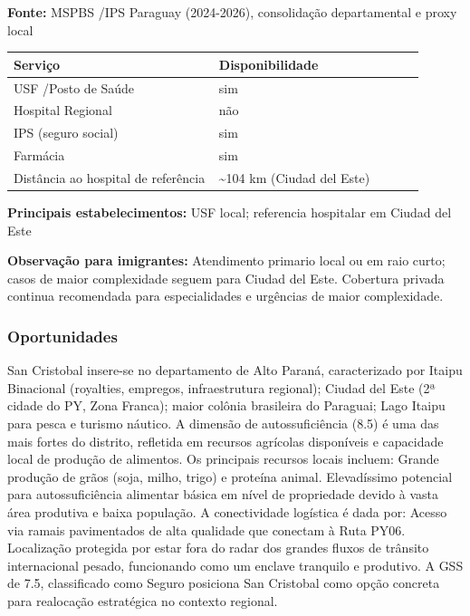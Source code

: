 \textbf{Fonte:} MSPBS /\allowbreak  IPS Paraguay (2024-2026), consolidação
departamental e proxy local

{\def\LTcaptype{none} %
\begin{longtable}{@{}>{\raggedright\arraybackslash}p{0.45\linewidth} >{\raggedright\arraybackslash}p{0.45\linewidth}@{}}
\toprule\noalign{}
Serviço & Disponibilidade \\
\midrule\noalign{}
\endhead
\bottomrule\noalign{}
\endlastfoot
USF /\allowbreak  Posto de Saúde & sim \\
Hospital Regional & não \\
IPS (seguro social) & sim \\
Farmácia & sim \\
Distância ao hospital de referência & \textasciitilde104 km (Ciudad del
Este) \\
\end{longtable}
}

\textbf{Principais estabelecimentos:} USF local; referencia hospitalar
em Ciudad del Este

\textbf{Observação para imigrantes:} Atendimento primario local ou em
raio curto; casos de maior complexidade seguem para Ciudad del Este.
Cobertura privada continua recomendada para especialidades e urgências
de maior complexidade.
\newpage

\subsubsection*{Oportunidades}\label{oport-san-cristobal-1012}
San Cristobal insere-se no departamento de Alto Paraná, caracterizado por Itaipu Binacional (royalties, empregos, infraestrutura regional); Ciudad del Este (2ª cidade do PY, Zona Franca); maior colônia brasileira do Paraguai; Lago Itaipu para pesca e turismo náutico. A dimensão de autossuficiência (8.5) é uma das mais fortes do distrito, refletida em recursos agrícolas disponíveis e capacidade local de produção de alimentos. Os principais recursos locais incluem: Grande produção de grãos (soja, milho, trigo) e proteína animal. Elevadíssimo potencial para autossuficiência alimentar básica em nível de propriedade devido à vasta área produtiva e baixa população. A conectividade logística é dada por: Acesso via ramais pavimentados de alta qualidade que conectam à Ruta PY06. Localização protegida por estar fora do radar dos grandes fluxos de trânsito internacional pesado, funcionando como um enclave tranquilo e produtivo. A GSS de 7.5, classificado como Seguro posiciona San Cristobal como opção concreta para realocação estratégica no contexto regional.

